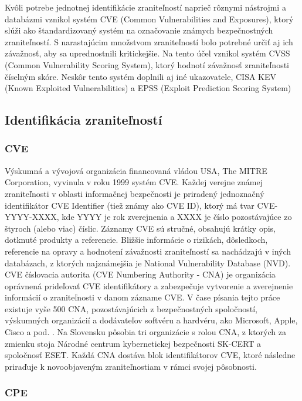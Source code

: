 Kvôli potrebe jednotnej identifikácie zraniteľností naprieč rôznymi nástrojmi a databázmi vznikol systém CVE (Common Vulnerabilities and Exposures), 
ktorý slúži ako štandardizovaný systém na označovanie známych bezpečnostných zraniteľností. 
S narastajúcim množstvom zraniteľností bolo potrebné určiť aj ich závažnosť, aby sa uprednostnili kritickejšie. Na tento účel vznikol
systém CVSS (Common Vulnerability Scoring System), ktorý hodnotí závažnosť zraniteľnosti číselným skóre. 
Neskôr tento systém doplnili aj iné ukazovatele, CISA KEV (Known Exploited Vulnerabilities) a EPSS (Exploit Prediction Scoring System)


\subsection{Identifikácia zraniteľností}
\label{subsec:identifikaciaZranitelnosti}
\subsubsection*{CVE}
Výskumná a vývojová organizácia financovaná vládou USA, The MITRE Corporation, vyvinula v roku 1999 systém CVE. 
Každej verejne známej zraniteľnosti v oblasti informačnej bezpečnosti je priradený jednoznačný identifikátor 
CVE Identifier (tiež známy ako CVE ID), ktorý má tvar CVE-YYYY-XXXX, kde YYYY je rok zverejnenia a XXXX je číslo 
pozostávajúce zo štyroch (alebo viac) číslic. Záznamy CVE sú stručné, obsahujú krátky opis, dotknuté produkty a referencie.
Bližšie informácie o rizikách, dôsledkoch, referencie na opravy a hodnotení závažnosti zraniteľností sa nachádzajú v iných
databázach, z ktorých najznámejšia je National Vulnerability Database (NVD).
CVE číslovacia autorita (CVE Numbering Authority - CNA) je organizácia oprávnená prideľovať CVE 
identifikátory a zabezpečuje vytvorenie a zverejnenie informácií o zraniteľnosti v danom zázname CVE.
V čase písania tejto práce existuje vyše 500 CNA, pozostávajúcich z bezpečnostných spoločností, výskumných organizácií a dodávateľov
softvéru a hardvéru, ako Microsoft, Apple, Cisco a pod. \cite{cvePartners}. Na Slovensku pôsobia tri organizácie s rolou CNA, z ktorých za zmienku 
stoja Národné centrum kybernetickej bezpečnosti SK-CERT a spoločnosť ESET. Každá CNA dostáva blok identifikátorov CVE,
ktoré následne priraďuje k novoobjaveným zraniteľnostiam v rámci svojej pôsobnosti.

\subsubsection*{CPE}

